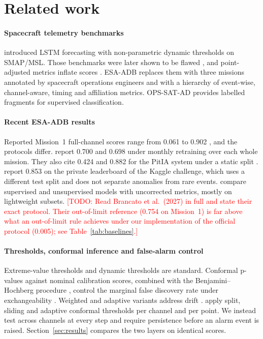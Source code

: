 \documentclass[preprint,12pt,authoryear]{elsarticle}
\newcommand{\todo}[1]{\textcolor{red}{[TODO: #1]}}
\begin{document}
\section{Related work}\label{sec:related}
\paragraph{Spacecraft telemetry benchmarks}
\citet{hundman2018} introduced LSTM forecasting with non-parametric dynamic thresholds on
SMAP/MSL. Those benchmarks were later shown to be flawed \citep{wu2021flawed}, and
point-adjusted metrics inflate scores \citep{kim2022rigorous}. ESA-ADB
\citep{kotowski2026esaadb} replaces them with three missions annotated by spacecraft
operations engineers and with a hierarchy of event-wise, channel-aware, timing and
affiliation metrics. OPS-SAT-AD \citep{ruszczak2025opssat} provides labelled fragments for
supervised classification.

\paragraph{Recent ESA-ADB results}
Reported Mission~1 full-channel scores range from 0.061 \citep{kotowski2026esaadb} to 0.902
\citep{brancato2027ast}, and the protocols differ. \citet{alcarria2026} report 0.700 and
0.698 under monthly retraining over each whole mission. They also cite 0.424 and 0.882 for
the PitIA system under a static split \citep{tejedor2025pitia}. \citet{allegrini2026} report
0.853 on the private leaderboard of the Kaggle challenge, which uses a different test split
and does not separate anomalies from rare events. \citet{nguyen2026} compare supervised and
unsupervised models with uncorrected metrics, mostly on lightweight subsets.
\todo{Read Brancato et al.\ (2027) in full and state their exact protocol. Their
out-of-limit reference (0.754 on Mission~1) is far above what an out-of-limit rule achieves
under our implementation of the official protocol (0.005); see Table~\ref{tab:baselines}.}

\paragraph{Thresholds, conformal inference and false-alarm control}
Extreme-value thresholds \citep{siffer2017} and dynamic thresholds \citep{hundman2018} are
standard. Conformal p-values against nominal calibration scores, combined with the
Benjamini--Hochberg procedure \citep{benjamini1995}, control the marginal false discovery
rate under exchangeability \citep{bates2023}. Weighted and adaptive variants address drift
\citep{barber2023,gibbs2021aci}. \citet{sahin2026tccad} apply split, sliding and adaptive
conformal thresholds per channel and per point. We instead test across channels at every
step and require persistence before an alarm event is raised. Section~\ref{sec:results}
compares the two layers on identical scores.
\end{document}
